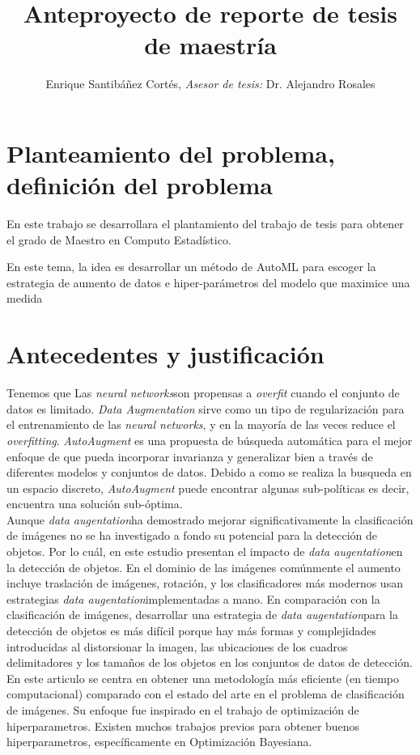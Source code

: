 \documentclass[11pt,letterpaper]{article}
\title{Anteproyecto de reporte de tesis de maestría}
\author{Enrique Santibáñez Cortés,
\textit{Asesor de tesis:} Dr. Alejandro Rosales}
\newcommand{\nns}{\textit{neural networks}}
\newcommand{\da}{\textit{data augentation}}
\begin{document}
\maketitle

\section*{Planteamiento del problema, definición del problema}
En este trabajo se desarrollara el plantamiento del trabajo de tesis para obtener el grado de Maestro en Computo Estadístico.

En este tema, la idea es desarrollar un método de AutoML para escoger la
estrategia de aumento de datos e hiper-parámetros del modelo que maximice una medida 


\section*{Antecedentes y justificación}
Tenemos que 
Las \nns son propensas a \textit{overfit} cuando el conjunto de datos es limitado. \textit{Data Augmentation} sirve como un tipo de regularización para el entrenamiento de las \nns, y en la mayoría de las veces reduce el \textit{overfitting}. \cite{augmented_random_search} \textit{AutoAugment} es una propuesta de búsqueda automática para el mejor enfoque de \ad que pueda incorporar invarianza y generalizar bien a través de diferentes modelos y conjuntos de datos. Debido a como se realiza la busqueda en un espacio discreto, \textit{AutoAugment} puede encontrar algunas sub-políticas es decir, encuentra una solución sub-óptima.\\

\cite{learning_data_augmentation_2} Aunque \da ha demostrado mejorar significativamente la clasificación de imágenes no se ha investigado a fondo su potencial para la detección de objetos. Por lo cuál, en este estudio presentan el impacto de \da en la detección de objetos. En el dominio de las imágenes comúnmente el aumento incluye traslación de imágenes, rotación, y los clasificadores más modernos usan estrategias \da implementadas a mano. En comparación con la clasificación de imágenes, desarrollar una estrategia de \da para la detección de objetos es más difícil porque hay más formas y complejidades introducidas al distorsionar la imagen, las ubicaciones de los cuadros delimitadores y los tamaños de los objetos en los conjuntos de datos de detección. \\

\cite{populaion_based_augmentatio_3} En este articulo se centra en obtener una metodología más eficiente (en tiempo computacional) comparado con el estado del arte en el problema de clasificación de imágenes. Su enfoque fue inspirado en el trabajo de optimización de hiperparametros. Existen muchos trabajos previos para obtener buenos hiperparametros, específicamente en Optimización Bayesiana. 
\end{document}
